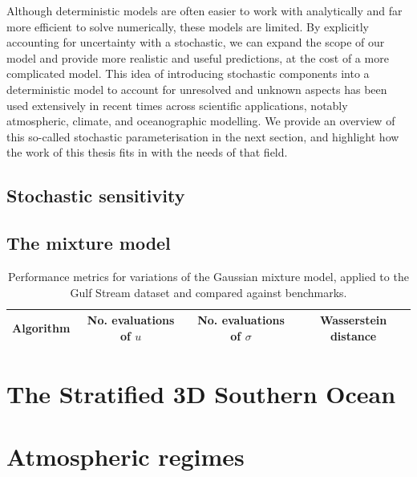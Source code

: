 Although deterministic models are often easier to work with analytically and far more efficient to solve numerically, these models are limited.
By explicitly accounting for uncertainty with a stochastic, we can expand the scope of our model and provide more realistic and useful predictions, at the cost of a more complicated model.
This idea of introducing stochastic components into a deterministic model to account for unresolved and unknown aspects has been used extensively in recent times across scientific applications, notably atmospheric, climate, and oceanographic modelling.
We provide an overview of this so-called stochastic parameterisation in the next section, and highlight how the work of this thesis fits in with the needs of that field.



\subsection{Stochastic sensitivity}




\subsection{The mixture model}



\begin{table}
	\begin{center}
		\begin{tabular}{|c|c|c|c|}
			\hline
			Algorithm & No. evaluations of \(u\) & No. evaluations of \(\sigma\) & Wasserstein distance \\ \hline
		\end{tabular}
	\end{center}
	\caption{Performance metrics for variations of the Gaussian mixture model, applied to the Gulf Stream dataset and compared against benchmarks.}
	\label{tab:}
\end{table}






\section{The Stratified 3D Southern Ocean}

\section{Atmospheric regimes}


